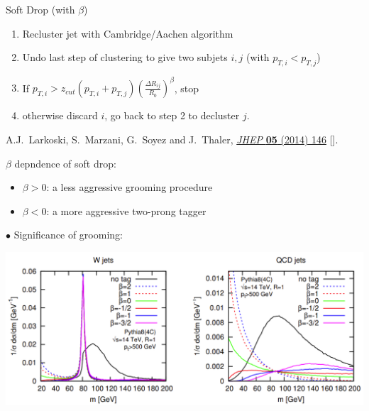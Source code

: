 \documentclass[9pt,a4paper,unknownkeysallowed,xcolor=dvipsnames,aspectratio=43]{beamer}
\begin{document}
\begin{frame}

{\color{darkred}{\Large$\bullet$} Soft Drop (with $\beta$)}
\begin{enumerate}
    \item Recluster jet with Cambridge/Aachen algorithm 
    \item Undo last step of clustering to give two subjets $i,j$ (with $p_{T,i} < p_{T,j}$) 
    \item If $p_{T,i} > z_{cut} (p_{T,i} + p_{T,j})\left(\frac{\Delta R_{ij}}{R_0}\right)^\beta$, stop \item otherwise discard $i$, go back to step 2 to decluster $j$.
\end{enumerate}
\begin{center}
    {\tiny \color{teablue} A.J.~Larkoski, S.~Marzani, G.~Soyez and J.~Thaler, %
  \href{https://doi.org/10.1007/JHEP05(2014)146}{\emph{JHEP} {\bfseries 05}
  (2014) 146} [\href{https://arxiv.org/abs/1402.2657}{{}}].}
\end{center}\vspace{2mm}

{\color{darkred}{\Large$\bullet$}} $\beta$ depndence of soft drop:
\vspace{2mm}
\begin{itemize}
    \item[\diamondsuit] $\beta >0$: a less aggressive grooming procedure
    \vspace{2mm}
        \item[\diamondsuit] $\beta <0$: a more aggressive two-prong tagger
\end{itemize}
\end{frame}
%
%
\begin{frame}\vspace{2mm}

{\color{darkred}\Large$\bullet$} Significance of grooming:
\vspace{4mm}
\begin{center}
\includegraphics[width=\textwidth]{05/WjetContamination.png}
\end{center}
\end{frame}
\end{document}
